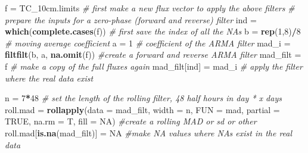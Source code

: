 \documentclass[
]{article}
\newenvironment{Shaded}{\begin{snugshade}}{\end{snugshade}}
\newcommand{\AttributeTok}[1]{\textcolor[rgb]{0.13,0.29,0.53}{#1}}
\newcommand{\CommentTok}[1]{\textcolor[rgb]{0.56,0.35,0.01}{\textit{#1}}}
\newcommand{\ConstantTok}[1]{\textcolor[rgb]{0.56,0.35,0.01}{#1}}
\newcommand{\DecValTok}[1]{\textcolor[rgb]{0.00,0.00,0.81}{#1}}
\newcommand{\FunctionTok}[1]{\textcolor[rgb]{0.13,0.29,0.53}{\textbf{#1}}}
\newcommand{\NormalTok}[1]{#1}
\newcommand{\OtherTok}[1]{\textcolor[rgb]{0.56,0.35,0.01}{#1}}
\newcommand{\SpecialCharTok}[1]{\textcolor[rgb]{0.81,0.36,0.00}{\textbf{#1}}}
\begin{document}
\begin{Shaded}
\begin{Highlighting}[]
\NormalTok{f }\OtherTok{=}\NormalTok{ TC\_10cm.limits }\CommentTok{\# first make a new flux vector to apply the above filters}
\CommentTok{\# prepare the inputs for a zero{-}phase (forward and reverse) filter  }
\NormalTok{ind       }\OtherTok{=} \FunctionTok{which}\NormalTok{(}\FunctionTok{complete.cases}\NormalTok{(f))   }\CommentTok{\# first save the index of all the NAs}
\NormalTok{b         }\OtherTok{=} \FunctionTok{rep}\NormalTok{(}\DecValTok{1}\NormalTok{,}\DecValTok{8}\NormalTok{)}\SpecialCharTok{/}\DecValTok{8}                 \CommentTok{\# moving average coefficient}
\NormalTok{a         }\OtherTok{=} \DecValTok{1}                          \CommentTok{\# coefficient of the ARMA filter}
\NormalTok{mad\_i    }\OtherTok{=} \FunctionTok{filtfilt}\NormalTok{(b, a, }\FunctionTok{na.omit}\NormalTok{(f)) }\CommentTok{\#create a forward and reverse ARMA filter}
\NormalTok{mad\_filt }\OtherTok{=}\NormalTok{ f                          }\CommentTok{\# make a copy of the full fluxes again}
\NormalTok{mad\_filt[ind] }\OtherTok{=}\NormalTok{ mad\_i                }\CommentTok{\# apply the filter where the real data exist}

\NormalTok{n }\OtherTok{=} \DecValTok{7}\SpecialCharTok{*}\DecValTok{48} \CommentTok{\# set the length of the rolling filter, 48 half hours in day * x days}
\NormalTok{roll.mad }\OtherTok{=} \FunctionTok{rollapply}\NormalTok{(}\AttributeTok{data =}\NormalTok{ mad\_filt,}
                     \AttributeTok{width =}\NormalTok{ n,}
                     \AttributeTok{FUN =}\NormalTok{ mad,}
                     \AttributeTok{partial =} \ConstantTok{TRUE}\NormalTok{,}
                     \AttributeTok{na.rm =}\NormalTok{ T,}
                     \AttributeTok{fill =} \ConstantTok{NA}\NormalTok{)  }\CommentTok{\#create a rolling MAD or sd or other}
\NormalTok{roll.mad[}\FunctionTok{is.na}\NormalTok{(mad\_filt)] }\OtherTok{=} \ConstantTok{NA}  \CommentTok{\#make NA values where NAs exist in the real data}


\end{Highlighting}
\end{Shaded}
\end{document}

